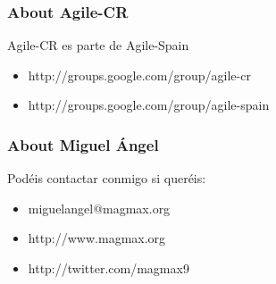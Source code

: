  \begin{frame}
  \frametitle{About Agile-CR}
  \only<+> {
  Agile-CR es parte de Agile-Spain
  \begin{itemize}
   \item http://groups.google.com/group/agile-cr
   \item http://groups.google.com/group/agile-spain
  \end{itemize}
  }
 \end{frame}

 \begin{frame}
  \frametitle{About Miguel Ángel}
  Podéis contactar conmigo si queréis:

  \begin{itemize}
   \item<+-> miguelangel@magmax.org
   \item<+-> http://www.magmax.org
   \item<+-> http://twitter.com/magmax9
  \end{itemize}
 \end{frame}
